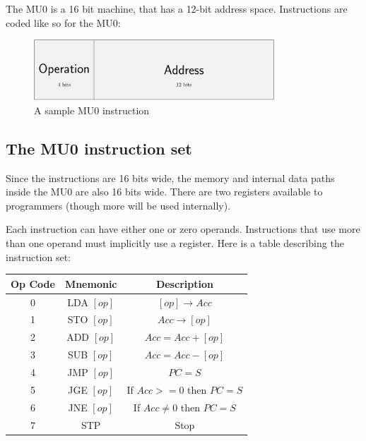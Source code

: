 The MU0 is a 16 bit machine, that has a 12-bit address space. Instructions are
coded like so for the MU0:

\begin{figure}[ht!]
	\centering
	\includegraphics[width=90mm]{instruction_format.pdf}
	\caption{A sample MU0 instruction}
	\label{overflow}
\end{figure}

\subsection{The MU0 instruction set}

Since the instructions are 16 bits wide, the memory and internal data paths
inside the MU0 are also 16 bits wide. There are two registers available to
programmers (though more will be used internally).

Each instruction can have either one or zero operands. Instructions that use
more than one operand must implicitly use a register. Here is a table describing
the instruction set:


\begin{center}
	\begin{tabular}{|c|c|c|}
		\hline
		{\bf Op Code} & {\bf Mnemonic} & {\bf Description}\\ \hline
		0 & LDA $[op]$ & $[op] \rightarrow Acc$\\ \hline
		1 & STO $[op]$ & $Acc \rightarrow [op]$\\ \hline
		2 & ADD $[op]$ & $Acc = Acc + [op]$\\ \hline
		3 & SUB $[op]$ & $Acc = Acc - [op]$\\ \hline
		4 & JMP $[op]$ & $PC = S$\\ \hline
		5 & JGE $[op]$ & If $Acc >= 0$ then $PC = S$\\ \hline
		6 & JNE $[op]$ & If $Acc \not= 0$ then $PC = S$\\ \hline
		7 & STP & Stop\\ \hline
	\end{tabular}
\end{center}

